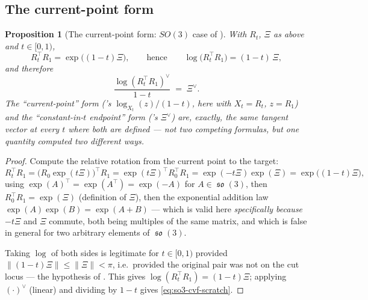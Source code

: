 \documentclass[11pt,a4paper]{report}
\newtheorem{proposition}[proposition]{Proposition}
\theoremstyle{definition}
\theoremstyle{remark}
\DeclareMathOperator{\so}{\mathfrak{so}}
\begin{document}
\subsection{The current-point form}

\begin{proposition}[The current-point form: $SO(3)$ case of ]
\label{prop:so3-current-point}
With $R_t$, $\Xi$ as above and $t\in[0,1)$,
\[
R_t^\top R_1 = \exp\bigl((1-t)\Xi\bigr) ,
\qquad\text{hence}\qquad
\log\bigl(R_t^\top R_1\bigr) = (1-t)\,\Xi ,
\]
and therefore
\begin{equation}
\label{eq:so3-cvf-scratch}
\frac{\log(R_t^\top R_1)^\vee}{1-t} \;=\; \Xi^\vee .
\end{equation}
The ``current-point'' form ('s
$\log_{X_t}(z)/(1-t)$, here with $X_t=R_t$, $z=R_1$) and the
``constant-in-$t$ endpoint'' form ('s
$\Xi^\vee$) are, exactly, the \emph{same} tangent vector at every $t$ where
both are defined --- not two competing formulas, but one quantity computed
two different ways.
\end{proposition}

\begin{proof}
Compute the relative rotation from the current point to the target:
\[
R_t^\top R_1
= \bigl(R_0\exp(t\Xi)\bigr)^\top R_1
= \exp(t\Xi)^\top R_0^\top R_1
= \exp(-t\Xi)\exp(\Xi)
= \exp\bigl((1-t)\Xi\bigr) ,
\]
using $\exp(A)^\top=\exp(A^\top)=\exp(-A)$ for $A\in\so(3)$, then
$R_0^\top R_1=\exp(\Xi)$ (definition of $\Xi$), then the exponential
addition law $\exp(A)\exp(B)=\exp(A+B)$ --- which is valid here
\emph{specifically because} $-t\Xi$ and $\Xi$ commute, both being multiples
of the same matrix, and which is false in general for two arbitrary elements
of $\so(3)$.

Taking $\log$ of both sides is legitimate for $t\in[0,1)$ provided
$\|(1-t)\Xi\|\le\|\Xi\|<\pi$, i.e.\ provided the original pair was not on the
cut locus --- the hypothesis of . This gives
$\log(R_t^\top R_1)=(1-t)\Xi$; applying $(\cdot)^\vee$ (linear) and dividing
by $1-t$ gives \eqref{eq:so3-cvf-scratch}.
\end{proof}
\end{document}
